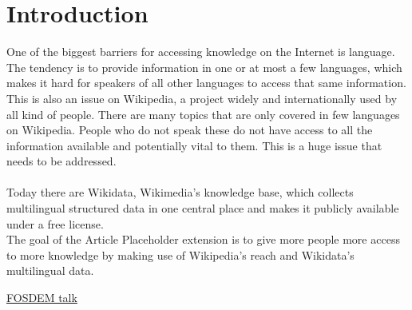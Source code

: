 \section{Introduction}
One of the biggest barriers for accessing knowledge on the Internet is language. The tendency is to provide information in one or at most a few languages, which makes it hard for speakers of all other languages to access that same information. This is also an issue on Wikipedia, a project  widely and internationally used by all kind of people. There are many topics that are only covered in few languages on Wikipedia. People who do not speak these do not have access to all the information available and potentially vital to them. This is a huge issue that needs to be addressed. \\
\\
Today there are Wikidata, Wikimedia’s knowledge base, which collects multilingual structured data in one central place and makes it publicly available under a free license. \\
The goal of the Article Placeholder extension  is to give more people more access to more knowledge by making use of Wikipedia’s reach and Wikidata’s multilingual data.


\href{https://www.fosdem.org/2016/schedule/event/increasing_access_to_free_and_open_knowledge_for_speakers_of_underserved_languages_on_wikipedia/}{FOSDEM talk}